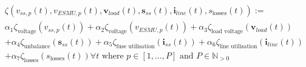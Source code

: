 
\begin{multline}
	\zeta(v_{ss,p}(t), v_{ESMU,p}(t), \textbf{v}_{load}(t), \textbf{s}_{ss}(t), \textbf{i}_{line}(t), s_\text{losses}(t)) :=\\
	\alpha_1 \zeta_\text{voltage}(v_{ss,p}(t))%
	+ \alpha_2 \zeta_\text{voltage}(v_{ESMU,p}(t))%
	+ \alpha_3 \zeta_\text{load voltage}(\textbf{v}_{load}(t))\\
	+ \alpha_4 \zeta_\text{unbalance}(\textbf{s}_{ss}(t))%
	+ \alpha_5 \zeta_\text{fuse utilisation}(\textbf{i}_{ss}(t))%
	+ \alpha_6 \zeta_\text{line utilisation}(\textbf{i}_{line}(t))\\
	+ \alpha_7 \zeta_\text{losses}(s_\text{losses}(t))%
	 \forall t \text{ where } p \in [1, \dots, P] \text{ and } P \in \mathbb{N}_{>0}
\label{ch1:equ:weighted-sum-cost-function}
\end{multline}